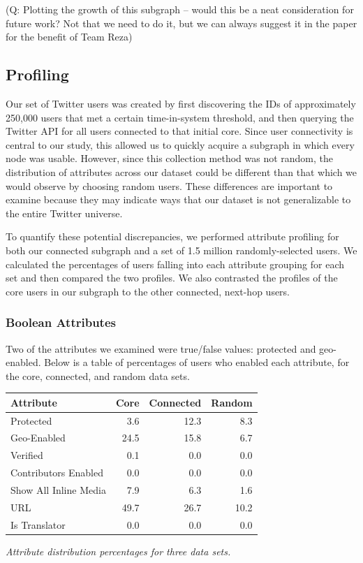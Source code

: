 (Q: Plotting the growth of this subgraph -- would this be a neat consideration for future work?  Not that we need to do it, but we can always suggest it in the paper for the benefit of Team Reza)

\subsection{Profiling}

Our set of Twitter users was created by first discovering the IDs of approximately 250,000 users that met a certain time-in-system threshold, and then querying the Twitter API for all users connected to that initial core.  Since user connectivity is central to our study, this allowed us to quickly acquire a subgraph in which every node was usable.  However, since this collection method was not random, the distribution of attributes across our dataset could be different than that which we would observe by choosing random users.  These differences are important to examine because they may indicate ways that our dataset is not generalizable to the entire Twitter universe.

To quantify these potential discrepancies, we performed attribute profiling for both our connected subgraph and a set of 1.5 million randomly-selected users.  We calculated the percentages of users falling into each attribute grouping for each set and then compared the two profiles.  We also contrasted the profiles of the core users in our subgraph to the other connected, next-hop users.

\subsubsection{Boolean Attributes}

Two of the attributes we examined were true/false values: protected and geo-enabled.  Below is a table of percentages of users who enabled each attribute, for the core, connected, and random data sets.

\begin{center}
\begin{tabular}{| l | r | r | r |}
\hline
\textbf{Attribute} & \textbf{Core} & \textbf{Connected} & \textbf{Random} \\ \hline
Protected & 3.6 & 12.3 & 8.3 \\ \hline
Geo-Enabled & 24.5 & 15.8 & 6.7 \\ \hline
Verified & 0.1 & 0.0 & 0.0 \\ \hline
Contributors Enabled & 0.0 & 0.0 & 0.0 \\ \hline
Show All Inline Media & 7.9 & 6.3 & 1.6 \\ \hline
URL & 49.7 & 26.7 & 10.2 \\ \hline
Is Translator & 0.0 & 0.0 & 0.0 \\ \hline
\end{tabular}
\end{center}
\textit{Attribute distribution percentages for three data sets.}\\

